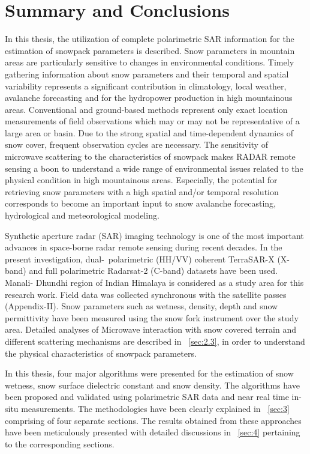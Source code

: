 \chapter{Summary and Conclusions}

In this thesis, the utilization of complete polarimetric SAR information for the estimation of snowpack parameters is described. Snow parameters in mountain areas are particularly sensitive to changes in environmental conditions. Timely gathering information about snow parameters and their temporal and spatial variability represents a significant contribution in climatology, local weather, avalanche forecasting and for the hydropower production in high mountainous areas. Conventional and ground-based methods represent only exact location measurements of field observations which may or may not be representative of a large area or basin. Due to the strong spatial and time-dependent dynamics of snow cover, frequent observation cycles are necessary. The sensitivity of microwave scattering to the characteristics of snowpack makes RADAR remote sensing a boon to understand a wide range of environmental issues related to the physical condition in high mountainous areas. Especially, the potential for retrieving snow parameters with a high spatial and/or temporal resolution corresponds to become an important input to snow avalanche forecasting, hydrological and meteorological modeling. 

Synthetic aperture radar (SAR) imaging technology is one of the most important advances in space-borne radar remote sensing during recent decades. In the present investigation, dual-~polarimetric (HH/VV) coherent TerraSAR-X (X-band) and full polarimetric Radarsat-2 (C-band) datasets have been used. Manali- Dhundhi region of Indian Himalaya is considered as a study area for this research work. Field data was collected synchronous with the satellite passes (Appendix-II). Snow parameters such as wetness, density, depth and snow permittivity have been measured using the snow fork instrument over the study area. Detailed analyses of  Microwave interaction with snow covered terrain and different scattering mechanisms are described in ~\cref{sec:2.3}, in order to understand the physical characteristics of snowpack parameters.

In this thesis, four major algorithms were presented for the estimation of snow wetness, snow surface dielectric constant and snow density. The algorithms have been proposed and validated using polarimetric SAR data and near real time in-situ measurements. The methodologies have been clearly explained in ~\cref{sec:3} comprising of four separate sections. The results obtained from these approaches have been meticulously presented with detailed discussions in ~\cref{sec:4} pertaining to the corresponding sections.

